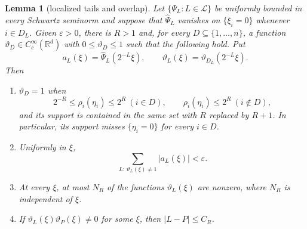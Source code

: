 \documentclass[11pt]{article}
\newtheorem{lemma}{Lemma}
\newcommand{\R}{\mathbb R}
\newcommand{\cL}{\mathcal L}
\begin{document}
\begin{lemma}[localized tails and overlap]\label{lem:tails}
Let $\{\Psi_L:L\in\cL\}$ be uniformly bounded in every Schwartz seminorm and
suppose that $\widehat\Psi_L$ vanishes on $\{\xi_i=0\}$ whenever
$i\in D_L$.  Given $\varepsilon>0$, there is $R>1$ and, for every
$D\subseteq\{1,\ldots,n\}$, a function
$\vartheta_D\in C_c^\infty(\R^d)$ with $0\le\vartheta_D\le1$ such that the
following hold.  Put
\[
  a_L(\xi)=\widehat\Psi_L(2^{-L}\xi),\qquad
  \vartheta_L(\xi)=\vartheta_{D_L}(2^{-L}\xi).
\]
Then
\begin{enumerate}
\item
  $\vartheta_D=1$ when
  \[
    2^{-R}\le\rho_i(\eta_i)\le2^R\ (i\in D),
    \qquad \rho_i(\eta_i)\le2^R\ (i\notin D),
  \]
  and its support is contained in the same set with $R$ replaced by $R+1$.
  In particular, its support misses $\{\eta_i=0\}$ for every $i\in D$.
\item
  Uniformly in $\xi$,
  \begin{equation}\label{eq:tail}
    \sum_{L:\,\vartheta_L(\xi)\ne1}|a_L(\xi)|<\varepsilon.
  \end{equation}
\item
  At every $\xi$, at most $N_R$ of the functions $\vartheta_L(\xi)$ are
  nonzero, where $N_R$ is independent of $\xi$.
\item
  If $\vartheta_L(\xi)\vartheta_P(\xi)\ne0$ for some $\xi$, then
  $|L-P|\le C_R$.
\end{enumerate}
\end{lemma}
\end{document}
